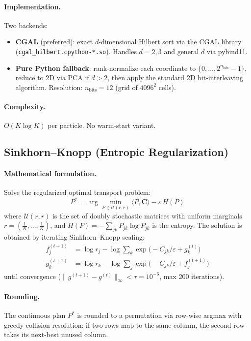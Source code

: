 \documentclass[11pt,a4paper]{article}
\newcommand{\bC}{\mathbf{C}}
\begin{document}
\paragraph{Implementation.}
Two backends:
\begin{itemize}
  \item \textbf{CGAL} (preferred): exact $d$-dimensional Hilbert sort via the CGAL library (\texttt{cgal\_hilbert.cpython-*.so}). Handles $d=2,3$ and general $d$ via pybind11.
  \item \textbf{Pure Python fallback}: rank-normalize each coordinate to $\{0,\dots,2^{n_{\text{bits}}}-1\}$, reduce to 2D via PCA if $d>2$, then apply the standard 2D bit-interleaving algorithm. Resolution: $n_{\text{bits}}=12$ (grid of $4096^2$ cells).
\end{itemize}

\paragraph{Complexity.} $O(K \log K)$ per particle. No warm-start variant.

\subsection{Sinkhorn--Knopp (Entropic Regularization)}
\label{sec:sinkhorn}

\paragraph{Mathematical formulation.}
Solve the regularized optimal transport problem:
\[
  P^* = \arg\min_{P \in \mathcal{U}(r,r)} \langle P, \bC \rangle - \varepsilon \, H(P)
\]
where $\mathcal{U}(r,r)$ is the set of doubly stochastic matrices with uniform marginals $r = (\frac{1}{K},\dots,\frac{1}{K})$, and $H(P) = -\sum_{jk} P_{jk} \log P_{jk}$ is the entropy. The solution is obtained by iterating Sinkhorn--Knopp scaling:
\begin{align}
  f^{(t+1)}_j &= \log r_j - \log\sum_k \exp\!\bigl(-C_{jk}/\varepsilon + g^{(t)}_k\bigr) \\
  g^{(t+1)}_k &= \log r_k - \log\sum_j \exp\!\bigl(-C_{jk}/\varepsilon + f^{(t+1)}_j\bigr)
\end{align}
until convergence ($\|g^{(t+1)}-g^{(t)}\|_\infty < \tau = 10^{-6}$, max 200 iterations).

\paragraph{Rounding.} The continuous plan $P^*$ is rounded to a permutation via row-wise argmax with greedy collision resolution: if two rows map to the same column, the second row takes its next-best unused column.
\end{document}
